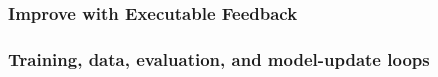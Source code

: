 



\subsubsection{Improve with Executable Feedback}





\subsubsection{Training, data, evaluation, and model-update loops}

